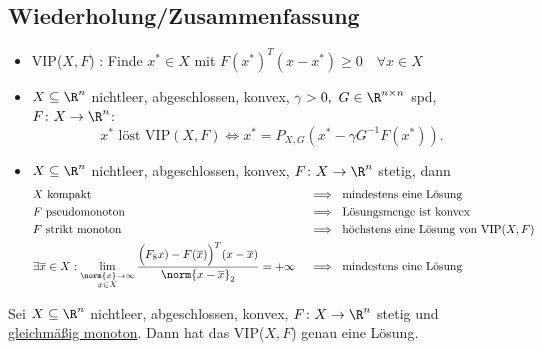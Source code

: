 \begin{mdframed}
\subsection*{Wiederholung/Zusammenfassung}
\label{sec:Wiederholung/Zusammenfassung}

\begin{itemize}
	\item VIP($X,F$) : Finde ${x}^{*} \in X$ mit $F({x}^{*})^{T}(x-{x}^{*}) \geq  0 \quad \forall x \in X$
	\item $X \subseteq \R^{n}$ nichtleer, abgeschlossen, konvex, $\gamma > 0,~ G \in \R^{n \times n}$ spd, $F \colon X \rightarrow \R^{n} $:
		\[
			{x}^{*}\text{ löst VIP}(X,F) \iff {x}^{*} = P_{X,G}({x}^{*}-\gamma G^{-1} F({x}^{*}))
		.\] 
	\item $X \subseteq \R^{n}$ nichtleer, abgeschlossen, konvex, $F \colon X \rightarrow \R^{n} $ stetig, dann
		\begin{align*}
			&X \text{ kompakt } &&\implies \text{ mindestens eine Lösung } \\
			&F \text{ pseudomonoton } &&\implies \text{ Lösungsmenge ist konvex }\\
			&F \text{ strikt monoton } &&\implies \text{ höchstens eine Lösung von VIP}(X,F) \\
			&\exists \overline{x} \in X : \lim_{\substack{\norm{x}  \rightarrow \infty \\ x \in X}} \frac{\Big( F_8x) - F(\overline{x}) \Big) ^{T}(x-\overline{x})}{\norm{x-\overline{x}}_{2} } = + \infty && \implies \text{ mindestens eine Lösung }
		\end{align*}
\end{itemize}
	
\end{mdframed}

\begin{korollar}
	Sei $X \subseteq \R^{n}$ nichtleer, abgeschlossen, konvex, $F \colon X \rightarrow \R^{n} $ stetig und \underline{gleichmäßig monoton}. Dann hat das VIP($X,F$) genau eine Lösung.
\end{korollar}

